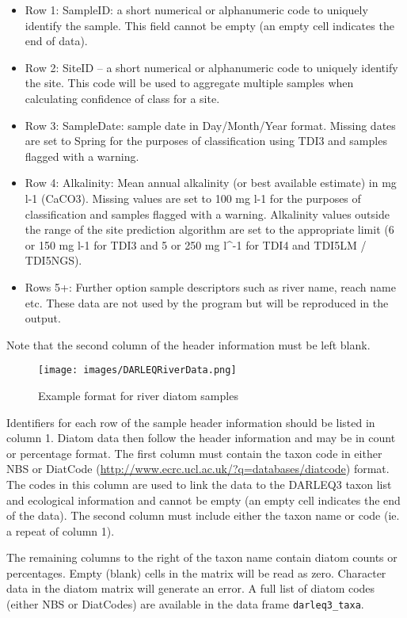 \documentclass[
]{article}
\begin{document}
\begin{itemize}
\item
  Row 1: SampleID: a short numerical or alphanumeric code to uniquely
  identify the sample. This field cannot be empty (an empty cell
  indicates the end of data).
\item
  Row 2: SiteID -- a short numerical or alphanumeric code to uniquely
  identify the site. This code will be used to aggregate multiple
  samples when calculating confidence of class for a site.
\item
  Row 3: SampleDate: sample date in Day/Month/Year format. Missing dates
  are set to Spring for the purposes of classification using TDI3 and
  samples flagged with a warning.
\item
  Row 4: Alkalinity: Mean annual alkalinity (or best available estimate)
  in mg l-1 (CaCO3). Missing values are set to 100 mg l-1 for the
  purposes of classification and samples flagged with a warning.
  Alkalinity values outside the range of the site prediction algorithm
  are set to the appropriate limit (6 or 150 mg l-1 for TDI3 and 5 or
  250 mg l\^{}-1 for TDI4 and TDI5LM / TDI5NGS).
\item
  Rows 5+: Further option sample descriptors such as river name, reach
  name etc. These data are not used by the program but will be
  reproduced in the output.
\end{itemize}

Note that the second column of the header information must be left
blank.

\begin{figure}
\centering
\texttt{[image: images/DARLEQRiverData.png]}
\caption{Example format for river diatom samples}
\end{figure}

Identifiers for each row of the sample header information should be
listed in column 1. Diatom data then follow the header information and
may be in count or percentage format. The first column must contain the
taxon code in either NBS or DiatCode
(\url{http://www.ecrc.ucl.ac.uk/?q=databases/diatcode}) format. The
codes in this column are used to link the data to the DARLEQ3 taxon list
and ecological information and cannot be empty (an empty cell indicates
the end of the data). The second column must include either the taxon
name or code (ie. a repeat of column 1).

The remaining columns to the right of the taxon name contain diatom
counts or percentages. Empty (blank) cells in the matrix will be read as
zero. Character data in the diatom matrix will generate an error. A full
list of diatom codes (either NBS or DiatCodes) are available in the data
frame \texttt{darleq3\_taxa}.
\end{document}
